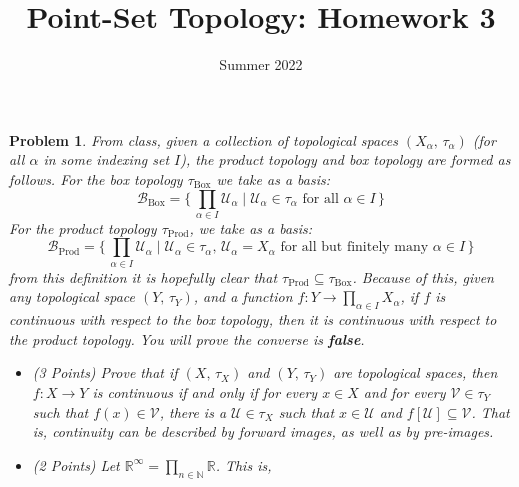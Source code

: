 \documentclass{article}
\title{Point-Set Topology: Homework 3}
\date{Summer 2022}
\theoremstyle{normal}
\newtheorem{problem}{Problem}
\begin{document}
    \maketitle
    \color{blue}
    \begin{problem}
        From class, given a collection of topological spaces
        $(X_{\alpha},\,\tau_{\alpha})$ (for all $\alpha$ in some indexing set
        $I$), the product topology and box topology are formed as follows.
        For the box topology $\tau_{\textrm{Box}}$ we take as a basis:
        \begin{equation}
            \mathcal{B}_{\textrm{Box}}
            =\Big\{\,\prod_{\alpha\in{I}}\mathcal{U}_{\alpha}\;|\;
                \mathcal{U}_{\alpha}\in\tau_{\alpha}
                \textrm{ for all }\alpha\in{I}\,\Big\}
        \end{equation}
        For the product topology $\tau_{\textrm{Prod}}$, we take as a basis:
        \begin{equation}
            \mathcal{B}_{\textrm{Prod}}
            =\Big\{\,\prod_{\alpha\in{I}}\mathcal{U}_{\alpha}\;|\;
                \mathcal{U}_{\alpha}\in\tau_{\alpha},\,
                \mathcal{U}_{\alpha}=X_{\alpha}
                \textrm{ for all but finitely many }\alpha\in{I}\,\Big\}
        \end{equation}
        from this definition it is hopefully clear that
        $\tau_{\textrm{Prod}}\subseteq\tau_{\textrm{Box}}$. Because of this,
        given any topological space $(Y,\,\tau_{Y})$, and a function
        $f:Y\rightarrow\prod_{\alpha\in{I}}X_{\alpha}$, if $f$ is continuous
        with respect to the box topology, then it is continuous with respect to
        the product topology. You will prove the converse is \textbf{false}.
        \begin{itemize}
            \item (3 Points) Prove that if $(X,\,\tau_{X})$ and
                $(Y,\,\tau_{Y})$ are topological spaces, then
                $f:X\rightarrow{Y}$ is continuous if and only if for every
                $x\in{X}$ and for every $\mathcal{V}\in\tau_{Y}$ such that
                $f(x)\in\mathcal{V}$, there is a $\mathcal{U}\in\tau_{X}$ such
                that $x\in\mathcal{U}$ and
                $f[\mathcal{U}]\subseteq\mathcal{V}$. That is, continuity
                can be described by forward images, as well as by pre-images.
            \item (2 Points) Let
                $\mathbb{R}^{\infty}=\prod_{n\in\mathbb{N}}\mathbb{R}$. This is,

\end{itemize}
\end{problem}
\end{document}

